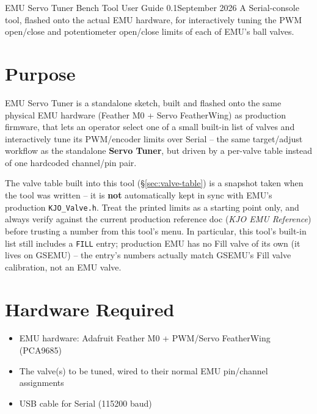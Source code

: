\documentclass[11pt,letterpaper]{article}
\newcommand{\docversion}{0.1}
\newcommand{\docdate}{September 2026}
\begin{document}


\KJOtitlepage%
  {EMU Servo Tuner}%
  {Bench Tool User Guide}%
  {\docversion}{\docdate}%
  {A Serial-console tool, flashed onto the actual EMU hardware, for
   interactively tuning the PWM open/close and potentiometer open/close
   limits of each of EMU's ball valves.}

\tableofcontents\newpage

\section{Purpose}

EMU Servo Tuner is a standalone sketch, built and flashed onto the same
physical EMU hardware (Feather M0 + Servo FeatherWing) as production
firmware, that lets an operator select one of a small built-in list of
valves and interactively tune its PWM/encoder limits over Serial -- the
same target/adjust workflow as the standalone \textbf{Servo Tuner}, but
driven by a per-valve table instead of one hardcoded channel/pin pair.

\begin{warningbox}
The valve table built into this tool (§\ref{sec:valve-table}) is a
snapshot taken when the tool was written -- it is \textbf{not}
automatically kept in sync with EMU's production \texttt{KJO\_Valve.h}.
Treat the printed limits as a starting point only, and always verify
against the current production reference doc (\textit{KJO EMU
Reference}) before trusting a number from this tool's menu. In
particular, this tool's built-in list still includes a \texttt{FILL}
entry; production EMU has no Fill valve of its own (it lives on GSEMU) --
the entry's numbers actually match GSEMU's Fill valve calibration, not an
EMU valve.
\end{warningbox}

\section{Hardware Required}

\begin{itemize}[nosep]
  \item EMU hardware: Adafruit Feather M0 + PWM/Servo FeatherWing (PCA9685)
  \item The valve(s) to be tuned, wired to their normal EMU pin/channel
        assignments
  \item USB cable for Serial (115200 baud)
\end{itemize}
\end{document}
